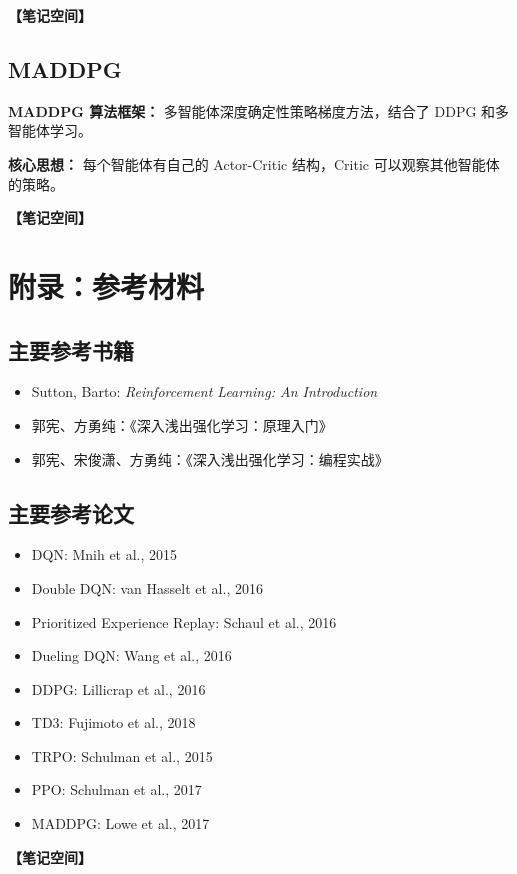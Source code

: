 \documentclass[12pt,a4paper]{article}
\newcommand{\notespace}[1][3cm]{%
  \vspace{#1}%
  \noindent\textbf{【笔记空间】}%
  \vspace{#1}%
}
\newcommand{\1}{\mathbf{1}}
\begin{document}
\notespace[2cm]

\subsection{MADDPG}

\begin{notebox}
\textbf{MADDPG 算法框架：} 多智能体深度确定性策略梯度方法，结合了 DDPG 和多智能体学习。

\textbf{核心思想：} 每个智能体有自己的 Actor-Critic 结构，Critic 可以观察其他智能体的策略。
\end{notebox}

\notespace[3cm]

\newpage

\section*{附录：参考材料}

\subsection*{主要参考书籍}

\begin{itemize}[leftmargin=2em]
  \item Sutton, Barto: \textit{Reinforcement Learning: An Introduction}
  \item 郭宪、方勇纯：《深入浅出强化学习：原理入门》
  \item 郭宪、宋俊潇、方勇纯：《深入浅出强化学习：编程实战》
\end{itemize}

\subsection*{主要参考论文}

\begin{itemize}[leftmargin=2em]
  \item DQN: Mnih et al., 2015
  \item Double DQN: van Hasselt et al., 2016
  \item Prioritized Experience Replay: Schaul et al., 2016
  \item Dueling DQN: Wang et al., 2016
  \item DDPG: Lillicrap et al., 2016
  \item TD3: Fujimoto et al., 2018
  \item TRPO: Schulman et al., 2015
  \item PPO: Schulman et al., 2017
  \item MADDPG: Lowe et al., 2017
\end{itemize}

\notespace[5cm]
\end{document}
